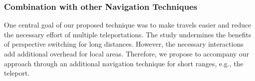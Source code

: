 \documentclass{sigchi}
\newcommand{\comm}[1]{}
\begin{document}
\subsubsection{Combination with other Navigation Techniques}
\comm{One central goal of our proposed technique was to make travels easier and reduce the necessary effort of multiple teleportations. While this goal was reached for long distances, the perspective switching does not provide many benefits for local areas. Instead, it adds an additional overhead through the necessary switches between NM and TM. Therefore, we propose to accompany our approach through an additional navigation technique for short ranges, e.g., the teleport.}
One central goal of our proposed technique was to make travels easier and reduce the necessary effort of multiple teleportations. The study undermines the benefits of perspective switching for long distances. However, the necessary interactions add additional overhead for local areas. Therefore, we propose to accompany our approach through an additional navigation technique for short ranges, e.g., the teleport.
\end{document}
